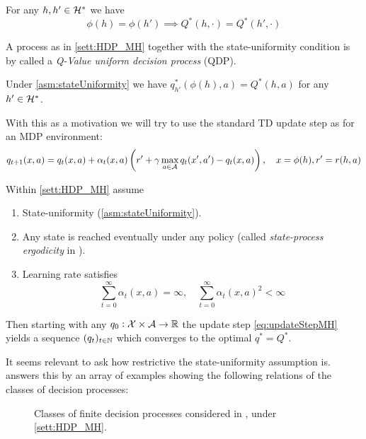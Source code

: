 \begin{asm}
  For any $h,h' \in \mathcal{H}^*$ we have
  \[ \phi(h) = \phi(h') \implies Q^*(h, \cdot) = Q^*(h', \cdot) \]
  \label{asm:stateUniformity}
\end{asm}

A process as in \cref{sett:HDP_MH} together with the state-uniformity condition
is by  called a \emph{Q-Value uniform decision process} (QDP).

\begin{thm}[Hutter, 2016]
  Under \cref{asm:stateUniformity} we have
  $q^*_{h'}(\phi(h), a) = Q^*(h, a)$ for any $h'\in \mathcal{H}^*$.
\end{thm}

With this as a motivation we will try to use
the standard TD update step as for an MDP environment:
\begin{equation}
  q_{t+1}(x, a) = q_t(x, a) + \alpha_t(x, a)
  \left(r' + \gamma \max_{a \in \mathcal{A}} q_t(x', a') - q_t(x, a)\right),
  \quad x = \phi(h), r' = r(h,a)
  \label{eq:updateStepMH}
\end{equation}

\begin{thm}
  Within \cref{sett:HDP_MH} assume
  \begin{enumerate}
    \item State-uniformity (\cref{asm:stateUniformity}).
    \item Any state is reached eventually under any policy
      (called \emph{state-process ergodicity} in ).
    \item Learning rate satisfies
      \[ \sum_{t=0}^\infty \alpha_t(x, a) = \infty, \quad
      \sum_{t=0}^\infty \alpha_t(x, a)^2 < \infty \]
  \end{enumerate}
  Then starting with any $q_0 : \mathcal{X} \times \mathcal{A} \to \mathbb{R}$
  the update step \cref{eq:updateStepMH} yields a sequence
  $(q_t)_{t \in \mathbb{N}}$ which converges to the optimal $q^* = Q^*$.
\end{thm}

It seems relevant to ask how restrictive the state-uniformity assumption is.
 answers this by an array of examples showing the following
relations of the classes of decision processes:

\begin{figure}[H]
  \centering
  \caption{Classes of finite decision processes considered in ,
  under \cref{sett:HDP_MH}.}
  \label{fig:DPMH}
\end{figure}

